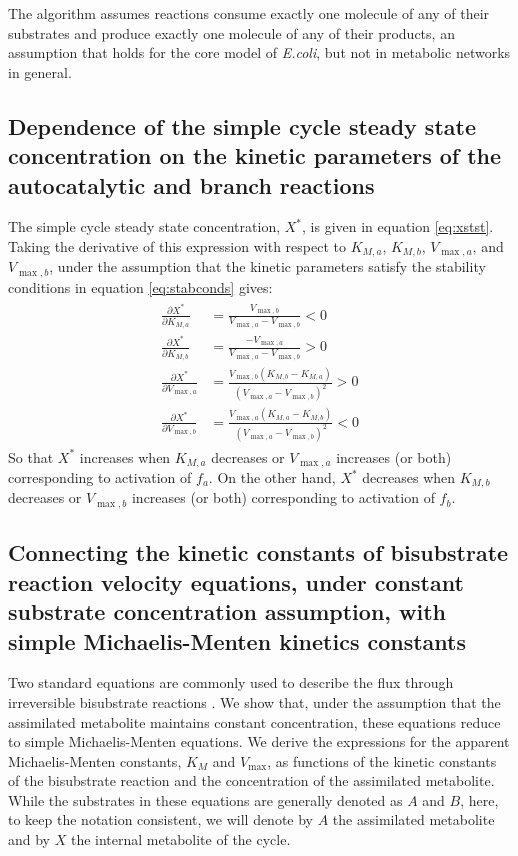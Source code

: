   The algorithm assumes reactions consume exactly one molecule of any of their substrates and produce exactly one molecule of any of their products, an assumption that holds for the core model of \emph{E.coli}, but not in metabolic networks in general.
  
  \subsection{Dependence of the simple cycle steady state concentration on the kinetic parameters of the autocatalytic and branch reactions}
  The simple cycle steady state concentration, $X^*$, is given in equation \ref{eq:xstst}.
  Taking the derivative of this expression with respect to $K_{M,a}$, $K_{M,b}$, $V_{\max,a}$, and $V_{\max,b}$, under the assumption that the kinetic parameters satisfy the stability conditions in equation \ref{eq:stabconds} gives:
  \begin{align}
      \begin{split}
          \label{eq:ststdep}
    \frac{\partial X^*}{\partial K_{M,a}}&=\frac{V_{\max,b}}{V_{\max,a}-V_{\max,b}}<0 \\
    \frac{\partial X^*}{\partial K_{M,b}}&=\frac{-V_{\max,a}}{V_{\max,a}-V_{\max,b}}>0 \\
    \frac{\partial X^*}{\partial V_{\max,a}}&=\frac{V_{\max,b}(K_{M,b}-K_{M,a})}{(V_{\max,a}-V_{\max,b})^2}>0 \\
    \frac{\partial X^*}{\partial V_{\max,b}}&=\frac{V_{\max,a}(K_{M,a}-K_{M,b})}{(V_{\max,a}-V_{\max,b})^2}<0
      \end{split}
  \end{align}
  So that $X^*$ increases when $K_{M,a}$ decreases or $V_{\max,a}$ increases (or both) corresponding to activation of $f_a$.
  On the other hand, $X^*$ decreases when $K_{M,b}$ decreases or $V_{\max,b}$ increases (or both) corresponding to activation of $f_b$.

  \subsection{Connecting the kinetic constants of bisubstrate reaction velocity equations, under constant substrate concentration assumption, with simple Michaelis-Menten kinetics constants}
  Two standard equations are commonly used to describe the flux through irreversible bisubstrate reactions \cite{Leskovac2003-li}.
  We show that, under the assumption that the assimilated metabolite maintains constant concentration, these equations reduce to simple Michaelis-Menten equations.
  We derive the expressions for the apparent Michaelis-Menten constants, $K_M$ and $V_{\max}$, as functions of the kinetic constants of the bisubstrate reaction and the concentration of the assimilated metabolite.
  While the substrates in these equations are generally denoted as $A$ and $B$, here, to keep the notation consistent, we will denote by $A$ the assimilated metabolite and by $X$ the internal metabolite of the cycle.

